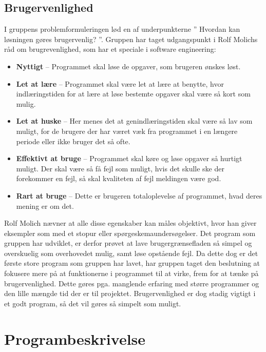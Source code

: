 \subsection{Brugervenlighed}
I gruppens problemformuleringen lød en af underpunkterne ” Hvordan kan løsningen gøres brugervenlig? ”. Gruppen har taget udgangspunkt i Rolf Molichs råd om brugrevenlighed, som har et speciale i software engineering: %

\begin{itemize}
	\item \textbf{Nyttigt} – Programmet skal løse de opgaver, som brugeren ønskes løst. 
	\item \textbf{Let at lære} – Programmet skal være let at lære at benytte, hvor indlæringstiden for at lære at løse bestemte opgaver skal være så kort som mulig.
	\item \textbf{Let at huske} – Her menes det at genindlæringstiden skal være så lav som muligt, for de brugere der har været væk fra programmet i en længere periode eller ikke bruger det så ofte. 
	\item \textbf{Effektivt at bruge} – Programmet skal køre og løse opgaver så hurtigt muligt. Der skal være så få fejl som muligt, hvis det skulle ske der forekommer en fejl, så skal kvaliteten af fejl meldingen være god.
	\item \textbf{Rart at bruge} – Dette er brugeren totaloplevelse af programmet, hvad deres mening er om det.
\end{itemize}

Rolf Molich nævner at alle disse egenskaber kan måles objektivt, hvor han giver eksempler som med et stopur eller spørgeskemaundersøgelser. Det program som gruppen har udviklet, er derfor prøvet at lave brugergrænsefladen så simpel og overskuelig som overhovedet mulig, samt løse opstående fejl. Da dette dog er det første store program som gruppen har lavet, har gruppen taget den beslutning at fokusere mere på at funktionerne i programmet til at virke, frem for at tænke på brugervenlighed.  Dette gøres pga. manglende erfaring med større programmer og den lille mængde tid der er til projektet. Brugervenlighed er dog stadig vigtigt i et godt program, så det vil gøres så simpelt som muligt. 





\section{Programbeskrivelse}


